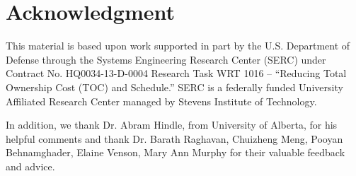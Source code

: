 \section*{Acknowledgment}
\label{sec:acknowledgment}
This material is based upon work supported in part by the U.S. Department of Defense through the Systems Engineering Research Center (SERC) under Contract No. HQ0034-13-D-0004 Research Task WRT 1016 -- ``Reducing Total Ownership Cost (TOC) and Schedule.'' 
SERC is a federally funded University Affiliated Research Center managed by Stevens Institute of Technology. 

In addition, we thank Dr. Abram Hindle, from University of Alberta, for his helpful comments and thank Dr. Barath Raghavan, Chuizheng Meng, Pooyan Behnamghader, Elaine Venson, Mary Ann Murphy for their valuable feedback and advice.
